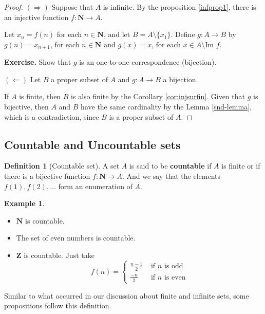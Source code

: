 \documentclass[tikz,12pt,a4paper]{article}
\theoremstyle{definition}
\newtheorem{example}{Example}[section]
\newtheorem{definition}{Definition}[section]
\begin{document}
\begin{proof}
	$(\Rightarrow)$ Suppose that $A$ is infinite. By the proposition \ref{infprop1}, there is an injective function $f : \textbf{N} \longrightarrow A$.
	
	Let $x_n = f(n)$ for each $n \in \textbf{N}$, and let $B = A \setminus \{ x_1 \}$. Define $g : A \longrightarrow B$ by $g(n) = x_{n+1}$, for each $n \in \textbf{N}$ and $g(x) = x$, for each $x \in A \setminus \text{Im } f$.
	
	\textbf{Exercise.} Show that $g$ is an one-to-one correspondence (bijection).
	
	$(\Leftarrow)$ Let $B$ a proper subset of $A$ and $g : A \longrightarrow B$ a bijection.
	
	If $A$ is finite, then $B$ is also finite by the Corollary \ref{cor:injsurfin}. Given that $g$ is bijective, then $A$ and $B$ have the same cardinality by the Lemma \ref{snd-lemma}, which is a contradiction, since $B$ is a proper subset of $A$.
\end{proof}

\subsection{Countable and Uncountable sets}

\begin{definition}[Countable set]
	A set $A$ is said to be \textbf{countable} if $A$ is finite or if there is a bijective function $f : \textbf{N} \longrightarrow A$. And we say that the elements $f(1), f(2), \ldots$ form an enumeration of $A$.
\end{definition}

\begin{example} \hfill
	\begin{itemize}
		\item $\textbf{N}$ is countable.
		\item The set of even numbers is countable.
		\item $\textbf{Z}$ is countable. Just take \[ f(n) = \begin{cases} 
      \frac{n-1}{2} & \text{ if } n \text{ is odd} \\
      \frac{-n}{2} & \text{ if } n \text{ is even}
   \end{cases} \]
	\end{itemize}
\end{example}

Similar to what occurred in our discussion about finite and infinite sets, some propositions follow this definition.
\end{document}
